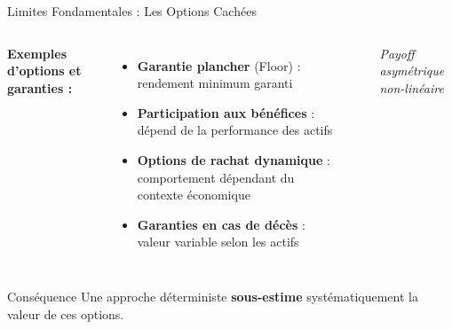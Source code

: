 \documentclass[10pt,aspectratio=169]{beamer}
\begin{document}
\begin{frame}{Limites Fondamentales : Les Options Cachées}
\begin{columns}
\textbf{Exemples d'options et garanties :}
\begin{itemize}
    \item \textbf{Garantie plancher} (Floor) : rendement minimum garanti
    \item \textbf{Participation aux bénéfices} : dépend de la performance des actifs
    \item \textbf{Options de rachat dynamique} : comportement dépendant du contexte économique
    \item \textbf{Garanties en cas de décès} : valeur variable selon les actifs
\end{itemize}

\begin{center}
\end{center}
\textit{Payoff asymétrique non-linéaire}
\end{columns}

\vspace{0.3cm}
\begin{exampleblock}{Conséquence}
Une approche déterministe \textbf{sous-estime} systématiquement la valeur de ces options.
\end{exampleblock}
\end{frame}
\end{document}
